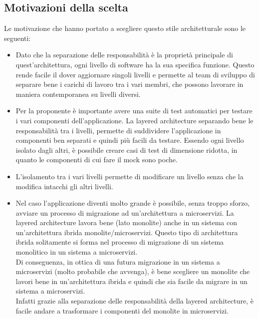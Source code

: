 \subsection{Motivazioni della scelta}
Le motivazione che hanno portato a scegliere questo stile architetturale sono le seguenti:
\begin{itemize}
    \item Dato che la separazione delle responsabilità è la proprietà principale di quest'architettura,
        ogni livello di software ha la sua specifica funzione. Questo rende facile il dover aggiornare 
        singoli livelli e permette al team di sviluppo di separare bene i carichi di lavoro tra i vari 
        membri, che possono lavorare in maniera contemporanea su livelli diversi.
    \item Per la proponente è importante avere una suite di test automatici per testare i vari componenti
        dell'applicazione. La layered architecture separando bene le responsabilità tra i livelli, 
        permette di suddividere l'applicazione in componenti ben separati e quindi più facili da testare.
        Essendo ogni livello isolato dagli altri, è possibile creare casi di test di dimensione ridotta, 
        in quanto le componenti di cui fare il \gls{mock} sono poche.
    \item L'isolamento tra i vari livelli permette di modificare un livello senza che la modifica intacchi
        gli altri livelli.
    \item Nel caso l'applicazione diventi molto grande è possibile, senza troppo sforzo, avviare un processo
        di migrazione ad un'architettura a microservizi. La layered architecture lavora bene (lato monolite) anche
        in un sistema con un'architettura ibrida monolite/microservizi. Questo tipo di architettura
        ibrida solitamente si forma nel processo di migrazione di un sistema monolitico in un sistema a microservizi.
        \\
        Di conseguenza, in ottica di una futura migrazione in un sistema a microservizi (molto probabile che avvenga), è
        bene scegliere un monolite che lavori bene in un'architettura ibrida e quindi che sia facile da migrare
        in un sistema a microservizi.
        \\
        Infatti grazie alla separazione delle responsabilità della layered architecture, è facile andare
        a trasformare i componenti del monolite in microservizi.
\end{itemize}

